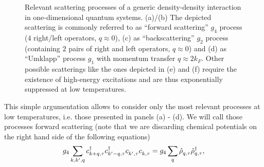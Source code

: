 \begin{figure}
    \caption{Relevant scattering processes of a generic density-density interaction in one-dimensional quantum systems. (a)/(b) The depicted scattering is commonly referred to as ``forward scattering'' $g_4$ process ($4$ right/left operators, $q\approx0$), (c) as ``backscattering'' $g_2$ process (containing $2$ pairs of right and left operators, $q\approx0$) and (d) as ``Umklapp'' process $g_1$ with momentum transfer $q\approx 2k_F$. Other possible scatterings like the ones depicted in (e) and (f) require the existence of high-energy excitations and are thus exponentially suppressed at low temperatures.}
    \label{fig:scattering_processes}
\end{figure}
This simple argumentation allows to consider only the most relevant processes at low temperatures, i.e. those presented in panels (a) - (d).
We will call those processes forward scattering (note that we are discarding chemical potentials on the right hand side of the following equations)
\begin{align}
    g_4\sum_{k,k',q}c^\dag_{k+q,\tau}c^\dag_{k'-q,\tau}c^\pdag_{k',\tau}c^\pdag_{k,\tau} = g_4 \sum_q\hat\rho^\pdag_{q,\tau}\hat\rho^\dag_{q,\tau},
\end{align}
